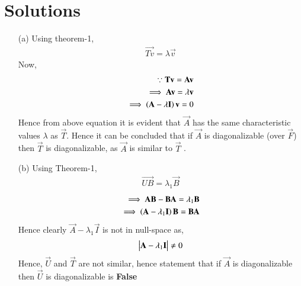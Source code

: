 \documentclass[journal,12pt,twocolumn]{IEEEtran}
\begin{document}
\section{Solutions}
\begin{enumerate}
\item[(a)]Using theorem-1,
\begin{align}
\vec{Tv} = \lambda \vec{v}
\end{align}
Now, 
\begin{align}
\because \mathbf{Tv} = \mathbf{Av}\\
\implies \mathbf{Av} = \lambda \mathbf{v}\\
\implies \left(\mathbf{A}-\lambda \mathbf{I}\right) \mathbf{v} = 0
\end{align}
Hence from above equation it is evident that $\vec{A}$ has the same characteristic values $\lambda$ as $\vec{T}$. Hence it can be concluded that if $\vec{A}$ is diagonalizable (over $\vec{F}$) then $\vec{T}$ is diagonalizable, as $\vec{A}$ is similar to $\vec{T}$ .
\item[(b)] Using Theorem-1,
\begin{align}
\vec{UB} = \lambda_1 \vec{B}
\end{align} 
\begin{align}
\implies \mathbf{AB-BA} = \lambda_1 \mathbf{B}\\
\implies \left(\mathbf{A}-\lambda_1 \mathbf{I}\right) \mathbf{B} = \mathbf{BA}
\end{align}
Hence clearly $\vec{A}-\lambda_1 \vec{I}$ is not in null-space as,
\begin{align}
\begin{vmatrix}\mathbf{A}-\lambda_1 \mathbf{I}\end{vmatrix} \neq 0
\end{align}
Hence, $\vec{U}$ and $\vec{T}$ are not similar, hence statement that if $\vec{A}$ is diagonalizable then $\vec{U}$ is diagonalizable is \textbf{False}
\end{enumerate}
\end{document}
